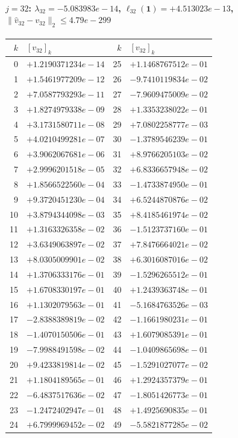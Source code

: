 \paragraph{$j = 32$: $\lambda_{32} = -5.083983e-14$, \quad $\ell_{32}(\mathbf{1}) = +4.513023e-13$, \quad $\|\hat{v}_{32} - v_{32}\|_2 \leq 4.79e-299$}
\begin{center}
{\footnotesize
\begin{tabular}{r@{\;\;}l@{\quad}r@{\;\;}l}
\toprule
$k$ & $[v_{32}]_k$ & $k$ & $[v_{32}]_k$ \\
\midrule
0 & $+1.2190371234e-14$ & 25 & $+1.1468767512e-01$ \\
1 & $+1.5461977209e-12$ & 26 & $-9.7410119834e-02$ \\
2 & $+7.0587793293e-11$ & 27 & $-7.9609475009e-02$ \\
3 & $+1.8274979338e-09$ & 28 & $+1.3353238022e-01$ \\
4 & $+3.1731580711e-08$ & 29 & $+7.0802258777e-03$ \\
5 & $+4.0210499281e-07$ & 30 & $-1.3789546239e-01$ \\
6 & $+3.9062067681e-06$ & 31 & $+8.9766205103e-02$ \\
7 & $+2.9996201518e-05$ & 32 & $+6.8336657948e-02$ \\
8 & $+1.8566522560e-04$ & 33 & $-1.4733874950e-01$ \\
9 & $+9.3720451230e-04$ & 34 & $+6.5244870876e-02$ \\
10 & $+3.8794344098e-03$ & 35 & $+8.4185461974e-02$ \\
11 & $+1.3163326358e-02$ & 36 & $-1.5123737160e-01$ \\
12 & $+3.6349063897e-02$ & 37 & $+7.8476664021e-02$ \\
13 & $+8.0305009901e-02$ & 38 & $+6.3016087016e-02$ \\
14 & $+1.3706333176e-01$ & 39 & $-1.5296265512e-01$ \\
15 & $+1.6708330197e-01$ & 40 & $+1.2439363748e-01$ \\
16 & $+1.1302079563e-01$ & 41 & $-5.1684763526e-03$ \\
17 & $-2.8388389819e-02$ & 42 & $-1.1661980231e-01$ \\
18 & $-1.4070150506e-01$ & 43 & $+1.6079085391e-01$ \\
19 & $-7.9988491598e-02$ & 44 & $-1.0409865698e-01$ \\
20 & $+9.4233819814e-02$ & 45 & $-1.5291027077e-02$ \\
21 & $+1.1804189565e-01$ & 46 & $+1.2924357379e-01$ \\
22 & $-6.4837517636e-02$ & 47 & $-1.8051426773e-01$ \\
23 & $-1.2472402947e-01$ & 48 & $+1.4925690835e-01$ \\
24 & $+6.7999969452e-02$ & 49 & $-5.5821877285e-02$ \\
\bottomrule
\end{tabular}
}
\end{center}


